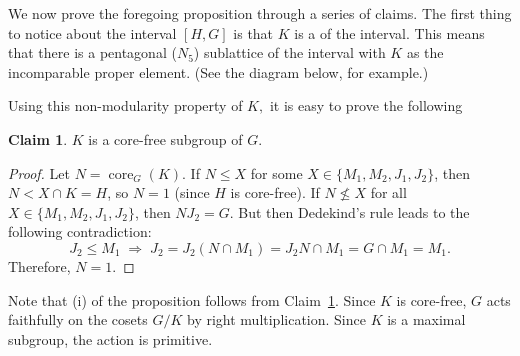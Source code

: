 \documentclass[11pt]{amsart}
\theoremstyle{plain}
\theoremstyle{definition}
\newcounter{claim}
\newtheorem{claim}[claim]{Claim}
\theoremstyle{remark}
\numberwithin{theorem}{section}
\numberwithin{claim}{section}
\numberwithin{equation}{section}
\numberwithin{conjecture}{section}
\newcommand{\<}{\ensuremath{\langle}}
\renewcommand{\>}{\ensuremath{\rangle}}
\renewcommand{\leq}{\ensuremath{\leqslant}}
\renewcommand{\nleq}{\ensuremath{\nleqslant}}
\newcommand{\core}{\ensuremath{\operatorname{core}}}
\newcommand{\0}{\ensuremath{\mathbf{0}}}
\newcommand{\1}{\ensuremath{\mathbf{1}}}
\newcommand{\2}{\ensuremath{\mathbf{2}}}
\newcommand{\3}{\ensuremath{\mathbf{3}}}
\newcommand{\4}{\ensuremath{\mathbf{4}}}
\newcommand{\5}{\ensuremath{\mathbf{5}}}
\begin{document}
We now prove the foregoing proposition through a series of claims.
The first thing to notice about the interval $[H,G]$ is that
$K$ is a  of the interval.  This means that
there is a pentagonal ($N_5$) sublattice of the interval with $K$ as the
incomparable proper element. (See the diagram below, for example.)
\begin{center}
  {
}
\end{center}
Using this non-modularity property of $K,$ it is easy to 
prove the following
\begin{claim}
\label{claim:K1corefree}
$K$ is a core-free subgroup of $G$.
\end{claim}
\begin{proof}
  Let $N = \core_G(K)$.  If $N \leq X$ for some $X \in \{M_1, M_2, J_1, J_2\}$, 
then $N < X\cap K = H$, so $N = 1$ (since $H$ is core-free).  If
  $N\nleq X$ for all $X \in \{M_1, M_2, J_1, J_2\}$, then $NJ_2 = G$.  But then
Dedekind's rule leads to the following contradiction:
\[
J_2 \leq M_1 \; \Longrightarrow \; J_2 = J_2(N\cap M_1) = J_2 N \cap M_1 =
G\cap M_1 = M_1.
\]
Therefore, $N = 1$.
\end{proof}
Note that (i) of the proposition follows from Claim~\ref{claim:K1corefree}.  Since
$K$ is core-free, $G$ acts faithfully on the
cosets $G/K$ by right multiplication.  Since $K$ is a maximal subgroup, the
action is primitive.
\end{document}
